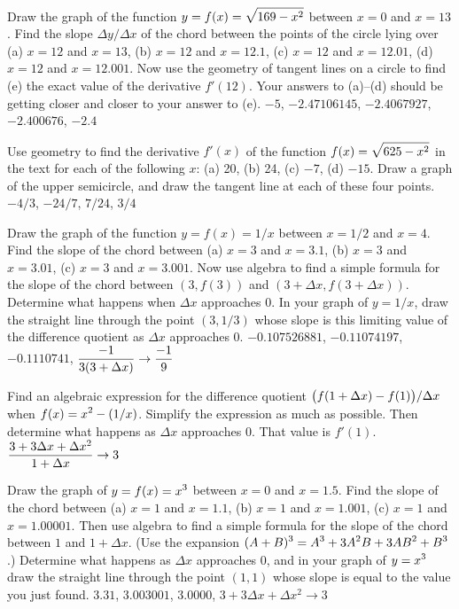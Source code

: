 \exercises

\exercise
Draw the graph of the function $\displaystyle y=f(x)=\sqrt{169-x^2}$ between $x=0$
and $x=13$.  Find the slope $\Delta y/\Delta x$ of the chord between the
points of the circle lying over (a) $x=12$ and $x=13$, (b) $x=12$ and
$x=12.1$,  (c) $x=12$ and $x=12.01$, (d) $x=12$ and $x=12.001$.  Now use
the geometry of tangent lines on a circle to find (e) the exact value of the
derivative $f'(12)$.  Your answers to (a)--(d) should be getting closer and
closer to your answer to (e).
\answer $-5$, $-2.47106145$, $-2.4067927$, $-2.400676$, $-2.4$
\endanswer
\endexercise

\exercise
Use geometry to find the derivative $f'(x)$ of the function
$\displaystyle f(x)=\sqrt{625-x^2}$ in the text for each of the following $x$: (a) 20,
(b) 24, (c) $-7$, (d) $-15$.  Draw a graph of the upper semicircle, and
draw the tangent line at each of these four points.
\answer $-4/3$, $-24/7$, $7/24$, $3/4$
\endanswer

\endexercise

\exercise
Draw the graph of the function $y=f(x)=1/x$ between $x=1/2$ and $x=4$.
Find the slope of the chord between (a) $x=3$ and $x=3.1$, (b) $x=3$ and
$x=3.01$, (c) $x=3$ and $x=3.001$.  Now use algebra to find a simple
formula for the slope of the chord between $(3,f(3))$ and $(3+\Delta
x,f(3+\Delta x))$.  Determine what happens when $\Delta x$ approaches 0.
In your graph of $y=1/x$, draw the straight line through the point
$(3,1/3)$ whose slope is this limiting value of the difference quotient as
$\Delta x$ approaches 0.
\answer $-0.107526881$, $-0.11074197$, $-0.1110741$, 
$\displaystyle{-1\over3(3+\Delta x)}\rightarrow {-1\over9}$
\endanswer
\endexercise

\exercise
Find an algebraic expression for the difference quotient $\displaystyle \bigl(f(1+\Delta
x)-f(1)\bigr)/\Delta x$ when $\displaystyle f(x)=x^2-(1/x)$.  Simplify the expression as
much as possible.  Then determine what happens as $\Delta x$ approaches 0.
That value is $f'(1)$.
\answer $\displaystyle{3+3\Delta x+\Delta x^2\over1+\Delta x}\rightarrow3$ 
\endanswer
\endexercise

\exercise
Draw the graph of $\displaystyle y=f(x)=x^3$ between $x=0$ and $x=1.5$.  Find the slope
of the chord between (a) $x=1$ and $x=1.1$, (b) $x=1$ and $x=1.001$, (c)
$x=1$ and $x=1.00001$.  Then use algebra to find a simple formula for the
slope of the chord between $1$ and $1+\Delta x$.  (Use the expansion
$\displaystyle (A+B)^3=A^3+3A^2B+3AB^2+B^3$.)  Determine what happens as $\Delta x$
approaches 0, and in your graph of $\displaystyle y=x^3$ draw the straight line through
the point $(1,1)$ whose slope is equal to the value you just found.
\answer $3.31$, $3.003001$, $3.0000$,\hfill\break
 $3+3\Delta x+\Delta x^2\rightarrow3$
\endanswer
\endexercise

